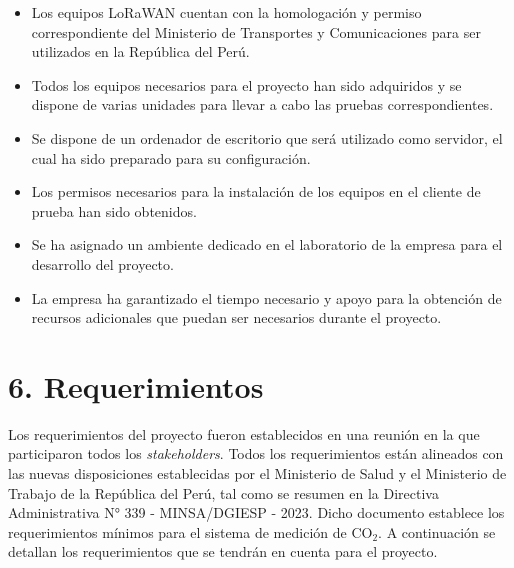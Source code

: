 \documentclass[
11pt, %
]{charter}
\begin{document}
\begin{itemize}
	\item Los equipos LoRaWAN cuentan con la homologación y permiso correspondiente del Ministerio de Transportes y Comunicaciones para ser utilizados en la República del Perú.
	\item Todos los equipos necesarios para el proyecto han sido adquiridos y se dispone de varias unidades para llevar a cabo las pruebas correspondientes.
	\item Se dispone de un ordenador de escritorio que será utilizado como servidor, el cual ha sido preparado para su configuración.
	\item Los permisos necesarios para la instalación de los equipos en el cliente de prueba han sido obtenidos. 
	\item Se ha asignado un ambiente dedicado en el laboratorio de la empresa para el desarrollo del proyecto.
	\item La empresa ha garantizado el tiempo necesario y apoyo para la obtención de recursos adicionales que puedan ser necesarios durante el proyecto.
\end{itemize}

\section{6. Requerimientos}
\label{sec:requerimientos}
Los requerimientos del proyecto fueron establecidos en una reunión en la que participaron todos los \textit{stakeholders}. Todos los requerimientos están alineados con las nuevas disposiciones establecidas por el Ministerio de Salud y el Ministerio de Trabajo de la República del Perú, tal como se resumen en la Directiva Administrativa N° 339 - MINSA/DGIESP - 2023. Dicho documento establece los requerimientos mínimos para el sistema de medición de CO$_{2}$. A continuación se detallan los requerimientos que se tendrán en cuenta para el proyecto.
\end{document}
